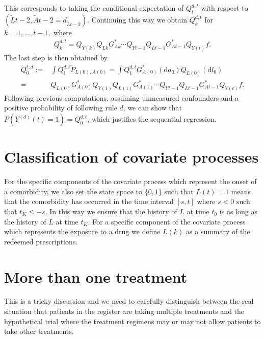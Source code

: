 \documentclass{article}
\newcommand{\A}{A}
\renewcommand{\L}{L}
\newcommand{\Y}{Y}
\newcommand{\Ystar}[2]{Y^{(#1)}(#2)}
\newcommand{\Lbar}{\tilde{L}}
\newcommand{\Abar}{\tilde{A}}
\renewcommand{\d}{\ensuremath{\mathrm{d}}}
\begin{document}
This corresponds to taking the conditional expectation of $Q_t^{d,t}$
with respect to $(\Lbar{t-2},\Abar{t-2}=d_{\Lbar{t-2}})$. Continuing
this way we obtain $Q_k^{d,t}$ for $k=1,...,t-1,$ where
\begin{align*}
 Q_k^{d,t}=Q_{\Y(k)}Q_{\L{k}}G^*_{\A{k}}\cdots Q_{\Y{t-1}}Q_{\L{t-1}}G^*_{\A{t-1}}Q_{\Y(t)}f.
\end{align*}
The last step is then obtained by
\begin{align*}
        Q_0^{t,d}:=&\int Q_1^{d,t}\tilde{P}_{\L(0),\A(0)}=\int Q_1^{d,t}G^*_{\A(0)}(\d a_0)Q_{\L(0)}(\d l_0)\\
        =&Q_{\L(0)}G^*_{\A(0)}Q_{\Y(1)}Q_{\L(1)}G^*_{\A(1)}\cdots Q_{\Y{t-1}}Q_{\L{t-1}}G^*_{\A{t-1}}Q_{\Y(t)}f.
\end{align*}
Following previous computations, assuming unmeasured confounders and a
positive probability of following rule $d$, we can show that
$P(\Ystar{d}{t}=1)=Q_0^{d,t}$, which justifies the sequential
regression.

\section{Classification of covariate processes}

For the specific components of the covariate process which represent
the onset of a comorbidity, we also set the state space to \(\{0,1\}\)
such that \(\L(t)=1\) means that the comorbidity has occurred in the
time interval \([s,t]\) where \(s<0\) such that \(t_K\le -s\). In this
way we ensure that the history of \(L\) at time \(t_0\) is as long as
the history of \(L\) at time \(t_K\). For a specific component of the
covariate process which represents the exposure to a drug we define
\(L(k)\) as a summary of the redeemed prescriptions.

\section{More than one treatment}

This is a tricky discussion and we need to carefully distinguish
between the real situation that patients in the register are taking
multiple treatments and the hypothetical trial where the treatment
regimens may or may not allow patients to take other treatments.
\end{document}
